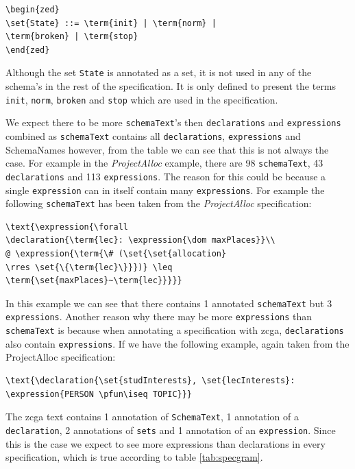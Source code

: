 \begin{verbatim}
\begin{zed}
\set{State} ::= \term{init} | \term{norm} |
\term{broken} | \term{stop}
\end{zed}
\end{verbatim}

Although the set \verb|State| is annotated as a set, it is not used in any of
the schema's in the rest of the specification. It is only defined to present the
terms \verb|init|, \verb|norm|, \verb|broken| and \verb|stop| which are used in
the specification.

We expect there to be more \texttt{schemaText}'s then \texttt{declarations} and
\texttt{expressions} combined as \texttt{schemaText} contains all
\texttt{declarations}, \texttt{expressions} and SchemaNames however, from the
table we can see that this is not always the case. For example in the
\emph{ProjectAlloc} example, there are 98 \texttt{schemaText}, 43
\texttt{declarations} and 113 \texttt{expressions}. The reason for this could be
because a single \texttt{expression} can in itself contain many
\texttt{expressions}. For example the following \texttt{schemaText} has been
taken from the \emph{ProjectAlloc} specification:

\begin{verbatim}
\text{\expression{\forall 
\declaration{\term{lec}: \expression{\dom maxPlaces}}\\
@ \expression{\term{\# (\set{\set{allocation}
\rres \set{\{\term{lec}\}}})} \leq \term{\set{maxPlaces}~\term{lec}}}}}
\end{verbatim}

In this example we can see that there contains 1 annotated \texttt{schemaText}
but 3 \texttt{expressions}. Another reason why there may be more
\texttt{expressions} than \texttt{schemaText} is because when annotating a
specification with \gls{zcga}, \texttt{declarations} also contain
\texttt{expressions}. If we have the following example, again taken from the
ProjectAlloc specification:

\begin{verbatim}
\text{\declaration{\set{studInterests}, \set{lecInterests}:
\expression{PERSON \pfun\iseq TOPIC}}}
\end{verbatim}

The \gls{zcga} text contains 1 annotation of \texttt{SchemaText}, 1 annotation
of a \texttt{declaration}, 2 annotations of \texttt{sets} and 1 annotation of an
\texttt{expression}. Since this is the case we expect to see more expressions
than declarations in every specification, which is true according to table
\ref{tab:specgram}.


